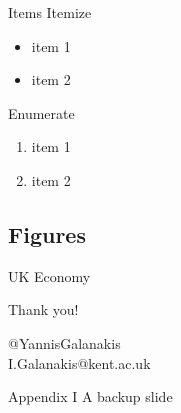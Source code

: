 \documentclass[compress,aspectratio=169, table]{beamer}
\begin{document}
\begin{frame}{Items}
  Itemize
  \begin{itemize}
    \item item 1
    \item item 2
  \end{itemize}

  \bigskip

  Enumerate
  \begin{enumerate}
    \item item 1
    \item item 2
  \end{enumerate}
\end{frame}

\subsection{Figures}

\begin{frame}{UK Economy}
\vspace*{-3em}
  \begin{figure}
    \centering
    
  \end{figure}
\end{frame}

\begin{frame}
	\centering
	{\Huge Thank you!}
	
	\begin{minipage}{0.4\textwidth}\hspace*{2em}
	\end{minipage}%
	\hfill
	\begin{minipage}{0.4\textwidth}\hspace*{1em}
		{ \large
			\textcolor{NordBlue}{\faTwitter}  @YannisGalanakis \\
			
			\hspace*{1em} \textcolor{NordBlue}{\faEnvelope}  I.Galanakis@kent.ac.uk 
		}
	\end{minipage}%
\end{frame}

\appendix
\backupbegin
\begin{frame}{Appendix I}
A backup slide

\end{frame}
\backupend
\end{document}
